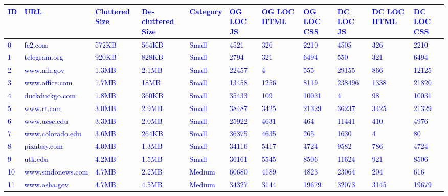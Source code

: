 % 
\begin{table*}[t]
\centering
\tiny
\textcolor{blue}{
\begin{tabular}{|l|ll|l|l|lll|lll|}
\toprule
ID &                  URL & Cluttered Size & De-cluttered Size & Category & OG LOC JS & OG LOC HTML & OG LOC CSS & DC LOC JS & DC LOC HTML & DC LOC CSS \\
\midrule
0  &                 fc2.com &          572KB &           564KB &    Small &      4521 &         326 &       2210 &      4505 &         326 &       2210 \\
1  &            telegram.org &          920KB &           828KB &    Small &      2794 &         321 &       6494 &       550 &         321 &       6494 \\
2  &             www.nih.gov &          1.3MB &           2.1MB &    Small &     22457 &           4 &        555 &     29155 &         866 &      12125 \\
3  &          www.office.com &          1.7MB &            18MB &    Small &     13458 &        1256 &       8119 &    238496 &        1338 &      21820 \\
4  &          duckduckgo.com &          1.8MB &           360KB &    Small &     35433 &         109 &      10031 &         4 &          98 &      10031 \\
5  &              www.rt.com &          3.0MB &           2.9MB &    Small &     38487 &        3425 &      21329 &     36237 &        3425 &      21329 \\
6  &            www.ucsc.edu &          3.3MB &           2.0MB &    Small &     25922 &        4631 &        464 &     11441 &         410 &       4976 \\
7  &        www.colorado.edu &          3.6MB &           264KB &    Small &     36375 &        4635 &        265 &      1630 &           4 &         80 \\
8  &             pixabay.com &          4.0MB &           1.3MB &    Small &     34116 &        5417 &       4724 &      9582 &         786 &       4724 \\
9  &                 utk.edu &          4.2MB &           1.5MB &    Small &     36161 &        5545 &       8506 &     11624 &         921 &       8506 \\\midrule
10 &       www.sindonews.com &          4.7MB &           2.2MB &   Medium &     60680 &        4189 &       4823 &     23064 &         204 &        616 \\
11 &            www.osha.gov &          4.7MB &           4.5MB &   Medium &     34327 &        3144 &      19679 &     32073 &        3145 &      19679 \\

\end{tabular}}
\end{table*}
